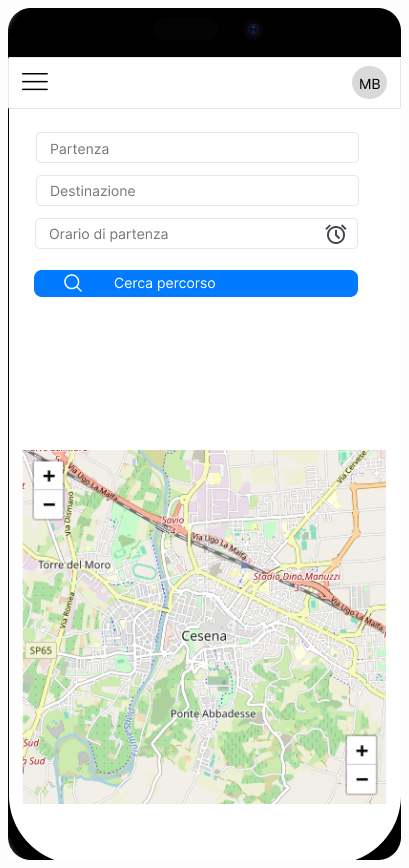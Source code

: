\begin{figure}[H]
  \centering
  \begin{minipage}[b]{0.45\textwidth}
    \centering
    \includegraphics[width=\textwidth]{images/mockup/Cerca percorso.png}

\end{minipage}
\end{figure}
